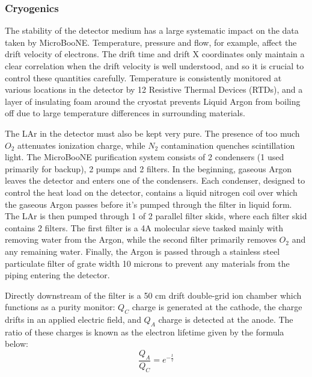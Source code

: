 \documentclass[12pt]{article}
\begin{document}
\subsubsection{Cryogenics}
\par The stability of the detector medium has a large systematic impact on the data taken by MicroBooNE. Temperature, pressure and flow, for example, affect the drift velocity of electrons. The drift time and drift X coordinates only maintain a clear correlation when the drift velocity is well understood, and so it is crucial to control these quantities carefully. Temperature is consistently monitored at various locations in the detector by 12 Resistive Thermal Devices (RTDs), and a layer of insulating foam around the cryostat prevents Liquid Argon from boiling off due to large temperature differences in surrounding materials.
\par The LAr in the detector must also be kept very pure. The presence of too much $O_2$ attenuates ionization charge, while $N_2$ contamination quenches scintillation light. The MicroBooNE purification system consists of 2 condensers (1 used primarily for backup), 2 pumps and 2 filters. In the beginning, gaseous Argon leaves the detector and enters one of the condensers. Each condenser, designed to control the heat load on the detector, contains a liquid nitrogen coil over which the gaseous Argon passes before it's pumped through the filter in liquid form. The LAr is then pumped through 1 of 2 parallel filter skids, where each filter skid contains 2 filters. The first filter is a 4A molecular sieve tasked mainly with removing water from the Argon, while the second filter primarily removes $O_2$ and any remaining water. Finally, the Argon is passed through a stainless steel particulate filter of grate width 10 microns to prevent any materials from the piping entering the detector. 
\par Directly downstream of the filter is a 50 cm drift double-grid ion chamber which functions as a purity monitor: $Q_C$ charge is generated at the cathode, the charge drifts in an applied electric field, and $Q_A$ charge is detected at the anode. The ratio of these charges is known as the electron lifetime given by the formula below: 
\begin{equation}
  \frac{Q_A}{Q_C} = e^{-\frac{t}{\tau}} 
\end{equation}
\end{document}
